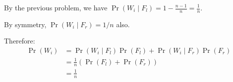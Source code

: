 \documentclass[11pt]{article}
\begin{document}
\begin{solution}
  By the previous problem, we have $\Pr(W_i \mid F_l) = 1 - \frac{n-1}{n} = \frac{1}{n}$.

  By symmetry, $\Pr(W_i \mid F_r) = 1/n$ also.

  Therefore:
  \begin{align*}
    \Pr(W_i) &= \Pr(W_i \mid F_l)\Pr(F_l) + \Pr(W_i \mid F_r)\Pr(F_r) \\
    &= \frac{1}{n}\left( \Pr(F_l) + \Pr(F_r) \right)\\
    &= \frac{1}{n}
  \end{align*}
\end{solution}
\end{document}
